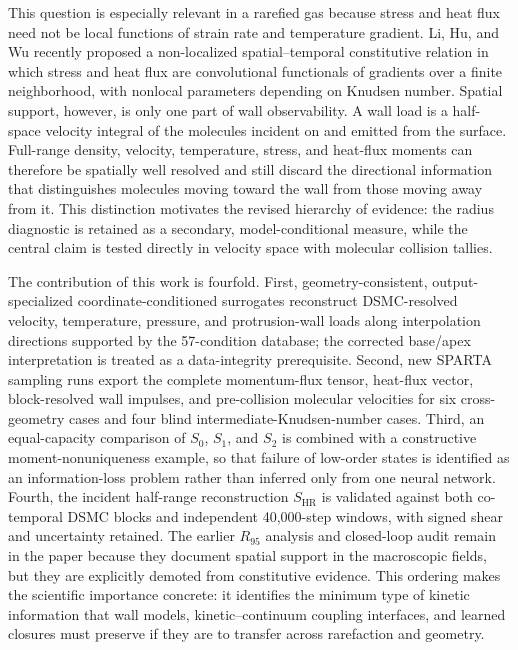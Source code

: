 \documentclass[aip,pof,preprint,floatfix,amsmath,amssymb]{revtex4-2}
\begin{document}
This question is especially relevant in a rarefied gas because stress and heat flux need not be local functions of strain rate and temperature gradient. Li, Hu, and Wu recently proposed a non-localized spatial--temporal constitutive relation in which stress and heat flux are convolutional functionals of gradients over a finite neighborhood, with nonlocal parameters depending on Knudsen number.\cite{LiHuWu2024} Spatial support, however, is only one part of wall observability. A wall load is a half-space velocity integral of the molecules incident on and emitted from the surface. Full-range density, velocity, temperature, stress, and heat-flux moments can therefore be spatially well resolved and still discard the directional information that distinguishes molecules moving toward the wall from those moving away from it. This distinction motivates the revised hierarchy of evidence: the radius diagnostic is retained as a secondary, model-conditional measure, while the central claim is tested directly in velocity space with molecular collision tallies.

The contribution of this work is fourfold. First, geometry-consistent, output-specialized coordinate-conditioned surrogates reconstruct DSMC-resolved velocity, temperature, pressure, and protrusion-wall loads along interpolation directions supported by the 57-condition database; the corrected base/apex interpretation is treated as a data-integrity prerequisite. Second, new SPARTA sampling runs export the complete momentum-flux tensor, heat-flux vector, block-resolved wall impulses, and pre-collision molecular velocities for six cross-geometry cases and four blind intermediate-Knudsen-number cases. Third, an equal-capacity comparison of $S_0$, $S_1$, and $S_2$ is combined with a constructive moment-nonuniqueness example, so that failure of low-order states is identified as an information-loss problem rather than inferred only from one neural network. Fourth, the incident half-range reconstruction $S_{\mathrm{HR}}$ is validated against both co-temporal DSMC blocks and independent 40,000-step windows, with signed shear and uncertainty retained. The earlier $R_{95}$ analysis and closed-loop audit remain in the paper because they document spatial support in the macroscopic fields, but they are explicitly demoted from constitutive evidence. This ordering makes the scientific importance concrete: it identifies the minimum type of kinetic information that wall models, kinetic--continuum coupling interfaces, and learned closures must preserve if they are to transfer across rarefaction and geometry.
\end{document}
